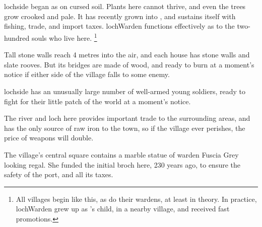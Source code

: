 

\section[\Glsfmttext{lochside}]{~~}
\label{lochside}

\begin{multicols}{2}

\begin{exampletext}
  \noindent
  \Gls{lochside} began as  on cursed soil.
  Plants here cannot thrive, and even the trees grow crooked and pale.
  It has recently grown into , and sustains itself with fishing, trade, and import taxes.
  \Gls{lochWarden} functions effectively as  to the two-hundred souls who live here.%
  \footnote{All \glspl{village} begin like this, as do their \glspl{warden}, at least in theory.
  In practice, \gls{lochWarden} grew up as 's child, in a nearby \gls{village}, and received fast promotions.}
\end{exampletext}

Tall stone walls reach 4 metres into the air, and each house has stone walls and slate rooves.
But its bridges are made of wood, and ready to burn at a moment's notice if either side of the \gls{village} falls to some enemy.

\Gls{lochside} has an unusually large number of well-armed young soldiers, ready to fight for their little patch of the world at a moment's notice.

The river and loch here provides important trade to the surrounding areas, and has the only source of raw iron to the town, so if the \gls{village} ever perishes, the price of weapons will double.



The \gls{village}'s central square contains a marble statue of \Gls{warden} Fuscia Grey looking regal.
She funded the initial \gls{broch} here, 230 years ago, to ensure the safety of the port, and all its taxes.


\end{multicols}
